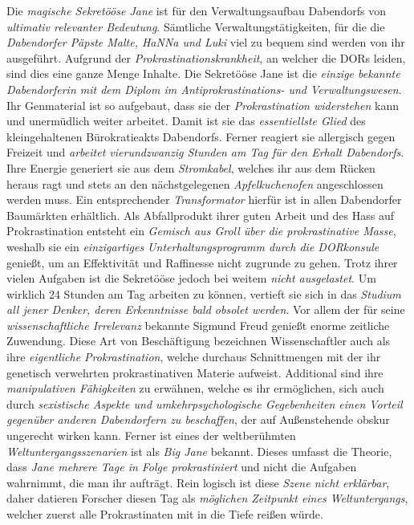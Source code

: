 Die \textit{magische Sekretööse Jane} ist für den Verwaltungsaufbau Dabendorfs von \textit{ultimativ relevanter Bedeutung}. Sämtliche Verwaltungstätigkeiten, für die die \textit{Dabendorfer Päpste Malte, HaNNa und Luki} viel zu bequem sind werden von ihr ausgeführt. Aufgrund der \textit{Prokrastinationskrankheit}, an welcher die DORs leiden, sind dies eine ganze Menge Inhalte. Die Sekretööse Jane ist die \textit{einzige bekannte Dabendorferin mit dem Diplom im Antiprokrastinations- und Verwaltungswesen}. Ihr Genmaterial ist so aufgebaut, dass sie der \textit{Prokrastination widerstehen} kann und unermüdlich weiter arbeitet. Damit ist sie das \textit{essentiellste Glied} des kleingehaltenen Bürokratieakts Dabendorfs. Ferner reagiert sie allergisch gegen Freizeit und \textit{arbeitet vierundzwanzig Stunden am Tag für den Erhalt Dabendorfs}. Ihre Energie generiert sie aus dem \textit{Stromkabel}, welches ihr aus dem Rücken heraus ragt und stets an den nächstgelegenen \textit{Apfelkuchenofen} angeschlossen werden muss. Ein entsprechender \textit{Transformator} hierfür ist in allen Dabendorfer Baumärkten erhältlich. Als Abfallprodukt ihrer guten Arbeit und des Hass auf Prokrastination entsteht ein \textit{Gemisch aus Groll über die prokrastinative Masse}, weshalb sie ein \textit{einzigartiges Unterhaltungsprogramm durch die DORkonsule} genießt, um an Effektivität und Raffinesse nicht zugrunde zu gehen. Trotz ihrer vielen Aufgaben ist die Sekretööse jedoch bei weitem \textit{nicht ausgelastet}. Um wirklich 24 Stunden am Tag arbeiten zu können, vertieft sie sich in das \textit{Studium all jener Denker, deren Erkenntnisse bald obsolet werden}. Vor allem der für seine \textit{wissenschaftliche Irrelevanz} bekannte {\tiny Sigmund Freud} genießt enorme zeitliche Zuwendung. Diese Art von Beschäftigung bezeichnen Wissenschaftler auch als ihre \textit{eigentliche Prokrastination}, welche durchaus Schnittmengen mit der ihr genetisch verwehrten prokrastinativen Materie aufweist. Additional sind ihre \textit{manipulativen Fähigkeiten} zu erwähnen, welche es ihr ermöglichen, sich auch durch \textit{sexistische Aspekte und umkehrpsychologische Gegebenheiten einen Vorteil gegenüber anderen Dabendorfern zu beschaffen}, der auf Außenstehende obskur ungerecht wirken kann. Ferner ist eines der weltberühmten \textit{Weltuntergangsszenarien} ist als \textit{Big Jane} bekannt. Dieses umfasst die Theorie, dass \textit{Jane mehrere Tage in Folge prokrastiniert} und nicht die Aufgaben wahrnimmt, die man ihr aufträgt. Rein logisch ist diese \textit{Szene nicht erklärbar}, daher datieren Forscher diesen Tag als \textit{möglichen Zeitpunkt eines Weltuntergangs}, welcher zuerst alle Prokrastinaten mit in die Tiefe reißen würde.

